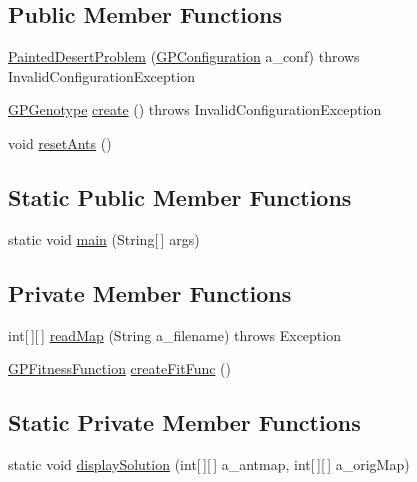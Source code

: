 \subsection*{Public Member Functions}
\begin{DoxyCompactItemize}
\item 
\hyperlink{classexamples_1_1gp_1_1painted_desert_1_1_painted_desert_problem_a336228da5ede1e8941de0e0fbcc9ddf1}{Painted\-Desert\-Problem} (\hyperlink{classorg_1_1jgap_1_1gp_1_1impl_1_1_g_p_configuration}{G\-P\-Configuration} a\-\_\-conf)  throws Invalid\-Configuration\-Exception 
\item 
\hyperlink{classorg_1_1jgap_1_1gp_1_1impl_1_1_g_p_genotype}{G\-P\-Genotype} \hyperlink{classexamples_1_1gp_1_1painted_desert_1_1_painted_desert_problem_af769c563aa96c625f561c6d5048b57d1}{create} ()  throws Invalid\-Configuration\-Exception 
\item 
void \hyperlink{classexamples_1_1gp_1_1painted_desert_1_1_painted_desert_problem_ad987f1c652432a1c84dd04e01eaec9d7}{reset\-Ants} ()
\end{DoxyCompactItemize}
\subsection*{Static Public Member Functions}
\begin{DoxyCompactItemize}
\item 
static void \hyperlink{classexamples_1_1gp_1_1painted_desert_1_1_painted_desert_problem_a1120cc5474f398f6bca54faf36918ad1}{main} (String\mbox{[}$\,$\mbox{]} args)
\end{DoxyCompactItemize}
\subsection*{Private Member Functions}
\begin{DoxyCompactItemize}
\item 
int\mbox{[}$\,$\mbox{]}\mbox{[}$\,$\mbox{]} \hyperlink{classexamples_1_1gp_1_1painted_desert_1_1_painted_desert_problem_a858cba734b2ab6ddaff7961f5c23cceb}{read\-Map} (String a\-\_\-filename)  throws Exception 
\item 
\hyperlink{classorg_1_1jgap_1_1gp_1_1_g_p_fitness_function}{G\-P\-Fitness\-Function} \hyperlink{classexamples_1_1gp_1_1painted_desert_1_1_painted_desert_problem_aef4e95845a36505b899c6374c8aa22f4}{create\-Fit\-Func} ()
\end{DoxyCompactItemize}
\subsection*{Static Private Member Functions}
\begin{DoxyCompactItemize}
\item 
static void \hyperlink{classexamples_1_1gp_1_1painted_desert_1_1_painted_desert_problem_a47f9cf5c06adcc3812ccfd79434ef7cf}{display\-Solution} (int\mbox{[}$\,$\mbox{]}\mbox{[}$\,$\mbox{]} a\-\_\-antmap, int\mbox{[}$\,$\mbox{]}\mbox{[}$\,$\mbox{]} a\-\_\-orig\-Map)
\end{DoxyCompactItemize}
